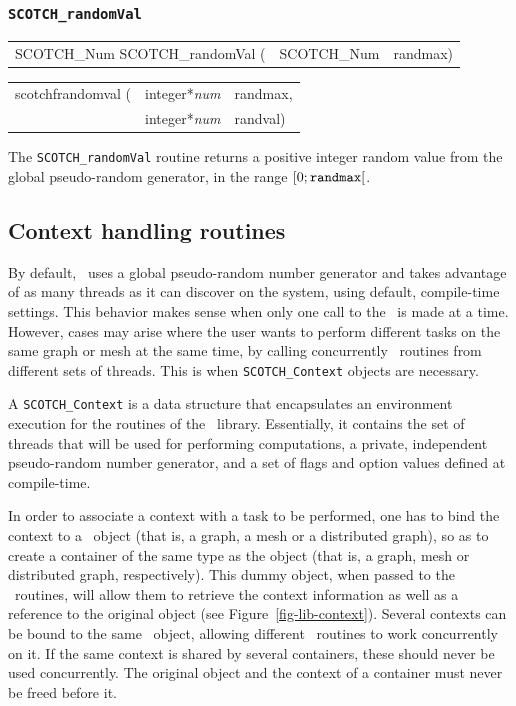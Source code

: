 \subsubsection{{\tt SCOTCH\_randomVal}}

\begin{itemize}
\progsyn

{\tt\begin{tabular}{l@{}ll}
SCOTCH\_Num SCOTCH\_randomVal ( & SCOTCH\_Num & randmax)
\end{tabular}}

{\tt\begin{tabular}{l@{}ll}
scotchfrandomval ( & integer*{\it num} & randmax, \\
                   & integer*{\it num} & randval)
\end{tabular}}

\progdes

The {\tt SCOTCH\_randomVal} routine returns a positive integer random
value from the global pseudo-random generator, in the range
$[0;\mbox{\texttt{randmax}}[$.
\end{itemize}

\subsection{Context handling routines}
\label{sec-lib-context}

By default, \scotch\ uses a global pseudo-random number generator and
takes advantage of as many threads as it can discover on the system,
using default, compile-time settings. This behavior makes sense when
only one call to the \libscotch\ is made at a time. However, cases may
arise where the user wants to perform different tasks on the same
graph or mesh at the same time, by calling concurrently
\libscotch\ routines from different sets of threads. This is when
\texttt{SCOTCH\_\lbt Context} objects are necessary.

A \texttt{SCOTCH\_\lbt Context} is a data structure that encapsulates
an environment execution for the routines of the
\libscotch\ library. Essentially, it contains the set of threads that
will be used for performing computations, a private, independent
pseudo-random number generator, and a set of flags and option values
defined at compile-time.

In order to associate a context with a task to be performed, one has
to bind the context to a \scotch\ object (that is, a graph, a mesh or
a distributed graph), so as to create a container of the same type as
the object (that is, a graph, mesh or distributed graph,
respectively). This dummy object, when passed to the
\libscotch\ routines, will allow them to retrieve the context
information as well as a reference to the original object (see
Figure~\ref{fig-lib-context}). Several contexts can be bound to the
same \scotch\ object, allowing different \libscotch\ routines to work
concurrently on it. If the same context is shared by several
containers, these should never be used concurrently. The original
object and the context of a container must never be freed before it.

